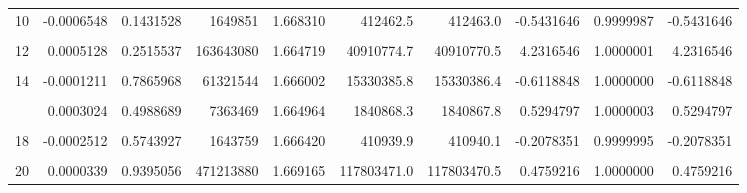 \documentclass[a4paper]{tufte-handout}
\begin{document}
\begin{table}
{\begin{tabular}[t]{rrrrrrrrrr}
10 & -0.0006548 & 0.1431528 & 1649851 & 1.668310 & 412462.5 & 412463.0 & -0.5431646 & 0.9999987 & -0.5431646\\
\addlinespace
\cellcolor{gray!6}{11} & \cellcolor{gray!6}{-0.0004414} & \cellcolor{gray!6}{0.3235916} & \cellcolor{gray!6}{39759746} & \cellcolor{gray!6}{1.667619} & \cellcolor{gray!6}{9939935.2} & \cellcolor{gray!6}{9939937.0} & \cellcolor{gray!6}{-1.7972904} & \cellcolor{gray!6}{0.9999998} & \cellcolor{gray!6}{-1.7972904}\\
12 & 0.0005128 & 0.2515537 & 163643080 & 1.664719 & 40910774.7 & 40910770.5 & 4.2316546 & 1.0000001 & 4.2316546\\
\cellcolor{gray!6}{13} & \cellcolor{gray!6}{-0.0004253} & \cellcolor{gray!6}{0.3416042} & \cellcolor{gray!6}{11220099} & \cellcolor{gray!6}{1.666779} & \cellcolor{gray!6}{2805024.3} & \cellcolor{gray!6}{2805025.2} & \cellcolor{gray!6}{-0.9196087} & \cellcolor{gray!6}{0.9999997} & \cellcolor{gray!6}{-0.9196087}\\
14 & -0.0001211 & 0.7865968 & 61321544 & 1.666002 & 15330385.8 & 15330386.4 & -0.6118848 & 1.0000000 & -0.6118848\\
\cellcolor{gray!6}{15} & \cellcolor{gray!6}{-0.0000186} & \cellcolor{gray!6}{0.9668654} & \cellcolor{gray!6}{431531} & \cellcolor{gray!6}{1.665694} & \cellcolor{gray!6}{107883.2} & \cellcolor{gray!6}{107883.2} & \cellcolor{gray!6}{-0.0078751} & \cellcolor{gray!6}{0.9999999} & \cellcolor{gray!6}{-0.0078751}\\
\addlinespace
16 & 0.0003024 & 0.4988689 & 7363469 & 1.664964 & 1840868.3 & 1840867.8 & 0.5294797 & 1.0000003 & 0.5294797\\
\cellcolor{gray!6}{17} & \cellcolor{gray!6}{-0.0000513} & \cellcolor{gray!6}{0.9087598} & \cellcolor{gray!6}{611103876} & \cellcolor{gray!6}{1.666259} & \cellcolor{gray!6}{152775968.7} & \cellcolor{gray!6}{152775969.5} & \cellcolor{gray!6}{-0.8177302} & \cellcolor{gray!6}{1.0000000} & \cellcolor{gray!6}{-0.8177302}\\
18 & -0.0002512 & 0.5743927 & 1643759 & 1.666420 & 410939.9 & 410940.1 & -0.2078351 & 0.9999995 & -0.2078351\\
\cellcolor{gray!6}{19} & \cellcolor{gray!6}{0.0000852} & \cellcolor{gray!6}{0.8489663} & \cellcolor{gray!6}{2205786} & \cellcolor{gray!6}{1.668551} & \cellcolor{gray!6}{551446.9} & \cellcolor{gray!6}{551446.9} & \cellcolor{gray!6}{0.0816938} & \cellcolor{gray!6}{1.0000001} & \cellcolor{gray!6}{0.0816938}\\
20 & 0.0000339 & 0.9395056 & 471213880 & 1.669165 & 117803471.0 & 117803470.5 & 0.4759216 & 1.0000000 & 0.4759216\\
\bottomrule
\end{tabular}}
\end{table}
\end{document}
